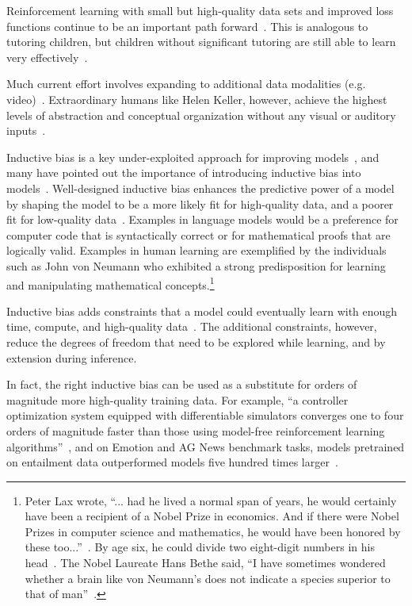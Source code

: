 \documentclass{article}
\begin{document}
Reinforcement learning with small but high-quality data sets and improved loss functions continue to be an important path forward~\citep{knight2023openai, thomaz2006reinforcement}. This is analogous to tutoring children, but children without significant tutoring are still able to learn very effectively~\citep{gopnik1999scientist}.

Much current effort involves expanding to additional data modalities (e.g. video)~\citep{DBLP:journals/corr/abs-1904-01766}.  Extraordinary humans like Helen Keller, however, achieve the highest levels of abstraction and conceptual organization without any visual or auditory inputs~\citep{herrmann1999helen}.

Inductive bias is a key under-exploited approach for improving models~\citep{goyal2022inductive}, and many have pointed out the importance of introducing inductive bias into models~\citep{mittal2022modular, DBLP:journals/corr/abs-2011-15091, DBLP:journals/corr/abs-2103-00336, gruber2013nature}. Well-designed inductive bias enhances the predictive power of a model by shaping the model to be a more likely fit for high-quality data, and a poorer fit for low-quality data~\citep{mackay2003information}. Examples in language models would be a preference for computer code that is syntactically correct or for mathematical proofs that are logically valid. Examples in human learning are exemplified by the individuals such as John von Neumann who exhibited a strong predisposition for learning and manipulating mathematical concepts.\footnote{Peter Lax wrote, ``... had he lived a normal span of years, he would certainly have been a recipient of a Nobel Prize in economics. And if there were Nobel Prizes in computer science and mathematics, he would have been honored by these too...''~\citep{Redei2005}. By age six, he could divide two eight-digit numbers in his head~\citep{Schneider2015, Henderson2007}. The Nobel Laureate Hans Bethe said, ``I have sometimes wondered whether a brain like von Neumann's does not indicate a species superior to that of man''~\citep{Macrae1992, Blair1957}.}

Inductive bias adds constraints that a model could eventually learn with enough time, compute, and high-quality data~\citep{welling2019}. The additional constraints, however, reduce the degrees of freedom that need to be explored while learning, and by extension during inference.

In fact, the right inductive bias can be used as a substitute for orders of magnitude more high-quality training data.  For example, ``a controller optimization system equipped with differentiable simulators converges one to four orders of magnitude faster than those using model-free reinforcement learning algorithms''~\citep{10.5555/3327757.3327820},  and on Emotion and AG News benchmark tasks, models pretrained on entailment data outperformed models five hundred times larger~\citep{ge-etal-2023-entailment}.
\end{document}

